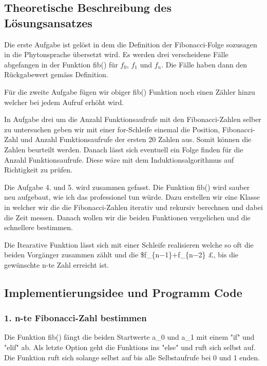 \documentclass[11pt]{article}
\begin{document}
\subsection{Theoretische Beschreibung des
Lösungsansatzes}\label{theoretische-beschreibung-des-luxf6sungsansatzes}

Die erste Aufgabe ist gelöst in dem die Definition der Fibonacci-Folge
sozusagen in die Phytonsprache übersetzt wird. Es werden drei
verscheidene Fälle abgefangen in der Funktion fib() für \(f_0\), \(f_1\)
und \(f_n\). Die Fälle haben dann den Rückgabewert gemäss Definition.

Für die zweite Aufgabe fügen wir obiger fib() Funktion noch einen Zähler
hinzu welcher bei jedem Aufruf erhöht wird.

In Aufgabe drei um die Anzahl Funktionsaufrufe mit den Fibonacci-Zahlen
selber zu untersuchen geben wir mit einer for-Schleife einemal die
Position, Fibonacci-Zahl und Anzahl Funktionsaufrufe der ersten 20
Zahlen aus. Somit können die Zahlen beurteilt werden. Danach lässt sich
eventuell ein Folge finden für die Anzahl Funktionsaufrufe. Diese wäre
mit dem Induktionsalgorithmus auf Richtigkeit zu prüfen.

Die Aufgabe 4. und 5. wird zusammen gefasst. Die Funktion fib() wird
sauber neu aufgebaut, wie ich das professionel tun würde. Dazu erstellen
wir eine Klasse in welcher wir die die Fibonacci-Zahlen iterativ und
rekursiv berechnen und dabei die Zeit messen. Danach wollen wir die
beiden Funktionen vergelichen und die schnellere bestimmen.

Die Itearative Funktion lässt sich mit einer Schleife realisieren welche
so oft die beiden Vorgänger zusammen zählt und die
\$f\_\{n−1\}+f\_\{n−2\} £, bis die gewünschte n-te Zahl erreicht ist.

\subsection{Implementierungsidee und Programm
Code}\label{implementierungsidee-und-programm-code}

\subsubsection{1. n-te Fibonacci-Zahl
bestimmen}\label{n-te-fibonacci-zahl-bestimmen}

Die Funktion fib() fängt die beiden Startwerte a\_0 und a\_1 mit einem
"if" und "elif" ab. Als letzte Option geht die Funktions ins "else" und
ruft sich selbst auf. Die Funktion ruft sich solange selbst auf bis alle
Selbstaufrufe bei 0 und 1 enden.
\end{document}

